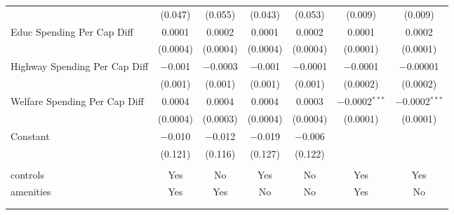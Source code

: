 \begin{table}[!htbp]
\begin{tabular}{@{\extracolsep{5pt}}lcccccc}
  & (0.047) & (0.055) & (0.043) & (0.053) & (0.009) & (0.009) \\ 
  Educ Spending Per Cap Diff & 0.0001 & 0.0002 & 0.0001 & 0.0002 & 0.0001 & 0.0002 \\ 
  & (0.0004) & (0.0004) & (0.0004) & (0.0004) & (0.0001) & (0.0001) \\ 
  Highway Spending Per Cap Diff & $-$0.001 & $-$0.0003 & $-$0.001 & $-$0.0001 & $-$0.0001 & $-$0.00001 \\ 
  & (0.001) & (0.001) & (0.001) & (0.001) & (0.0002) & (0.0002) \\ 
  Welfare Spending Per Cap Diff & 0.0004 & 0.0004 & 0.0004 & 0.0003 & $-$0.0002$^{***}$ & $-$0.0002$^{***}$ \\ 
  & (0.0004) & (0.0003) & (0.0004) & (0.0004) & (0.0001) & (0.0001) \\ 
  Constant & $-$0.010 & $-$0.012 & $-$0.019 & $-$0.006 &  &  \\ 
  & (0.121) & (0.116) & (0.127) & (0.122) &  &  \\ 
 \hline \\[-1.8ex] 
controls & Yes & No & Yes & No & Yes & Yes \\ 
amenities & Yes & Yes & No & No & Yes & No \\ 
\hline \\[-1.8ex] 
\hline 
\hline \\[-1.8ex] 
\end{tabular} 
\end{table} 

